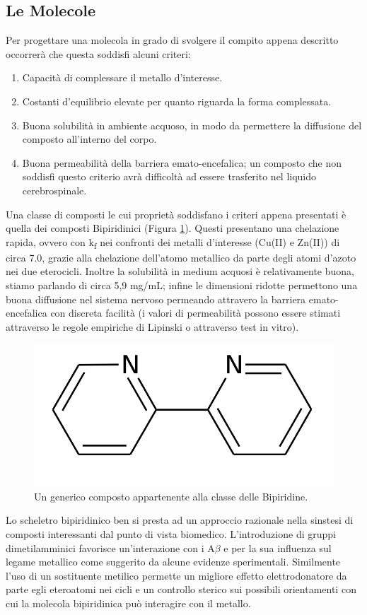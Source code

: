 \documentclass[a4paper, 12pt]{article}
\begin{document}
\subsection{Le Molecole}
\label{sec:bpy_mol}
Per progettare una molecola in grado di svolgere il compito appena descritto occorrerà che questa soddisfi alcuni criteri:
\begin{enumerate}
	\item Capacità di complessare il metallo d'interesse.
	\item Costanti d'equilibrio elevate per quanto riguarda la forma complessata.
	\item Buona solubilità in ambiente acquoso, in modo da permettere la diffusione del composto all'interno del corpo.
	\item Buona permeabilità della barriera emato-encefalica; un composto che non soddisfi questo criterio avrà difficoltà ad essere trasferito nel liquido cerebrospinale.
\end{enumerate}
Una classe di composti le cui proprietà soddisfano i criteri appena presentati è quella dei composti Bipiridinici (Figura \ref{fig:bpy}).
Questi presentano una chelazione rapida, ovvero con k\textsubscript{f} nei confronti dei metalli d'interesse (Cu(II) e Zn(II)) di circa 7.0, grazie alla chelazione dell'atomo metallico da parte degli atomi d'azoto nei due eterocicli. Inoltre la solubilità in medium acquosi è relativamente buona, stiamo parlando di circa 5,9 mg/mL; infine le dimensioni ridotte permettono una buona diffusione nel sistema nervoso permeando attravero la barriera emato-encefalica con discreta facilità (i valori di permeabilità possono essere stimati attraverso le regole empiriche di Lipinski o attraverso test in vitro\cite{di_high_2003}).
\begin{figure}[H]
	\centering
	\includegraphics[width=.3\linewidth]{immagini/bpy.png}
	\caption{Un generico composto appartenente alla classe delle Bipiridine.}
	\label{fig:bpy}
\end{figure}
Lo scheletro bipiridinico ben si presta ad un approccio razionale nella sinstesi di composti interessanti dal punto di vista biomedico.
L'introduzione di gruppi dimetilamminici favorisce un'interazione con i A$\beta$ e per la sua influenza sul legame metallico come suggerito da alcune evidenze sperimentali. Similmente l'uso di un sostituente metilico permette un migliore effetto elettrodonatore da parte egli eteroatomi nei cicli e un controllo sterico sui possibili orientamenti con cui la molecola bipiridinica può interagire con il metallo. \cite{derrick_importance_2016,savelieff_ongoing_2014}
\end{document}
